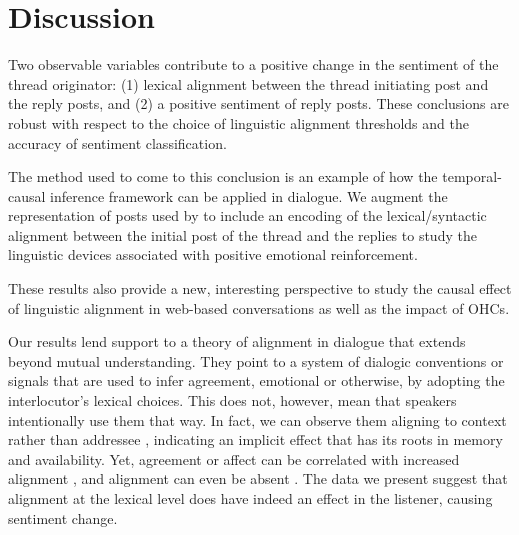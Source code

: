 \documentclass[man,biblatex,floatsintext]{apa6}
\begin{document}
\section{Discussion}







Two observable variables contribute to  a  positive  change  in  the  sentiment  of  the thread originator: (1) lexical  alignment  between the thread initiating post and the reply posts, and (2) a positive sentiment  of  reply  posts.  These conclusions are robust with respect to the choice of linguistic alignment thresholds and the accuracy of sentiment classification.

The method used to come to this conclusion is  an example of how the temporal-causal inference framework \parencite{bui2016temporal} can be applied in dialogue.
 We augment the representation of posts used by \textcite{bui2016temporal} to include an encoding of the lexical/syntactic alignment between the initial post of the thread and the replies to study the linguistic devices associated with positive emotional reinforcement.

These results also provide a new, interesting perspective to study the causal effect of linguistic alignment in web-based conversations as well as the impact of OHCs.


Our results lend support to a theory of alignment in dialogue that extends beyond mutual understanding.  They point to a system of dialogic conventions or signals that are used to infer agreement, emotional or otherwise, by adopting the interlocutor's lexical choices.  This does not, however, mean that speakers intentionally use them that way.  In fact, we can observe them aligning to context rather than addressee \parencite{reitter2017alignment,wang2014linguistic}, indicating an implicit effect that has its roots in memory and availability.  Yet, agreement or affect can be correlated with increased alignment \parencite{danescu2011chameleons}, and alignment can even be absent \parencite{healey2014divergence}.  The data we present suggest that alignment at the lexical level does have indeed an effect in the listener, causing sentiment change.
\end{document}
